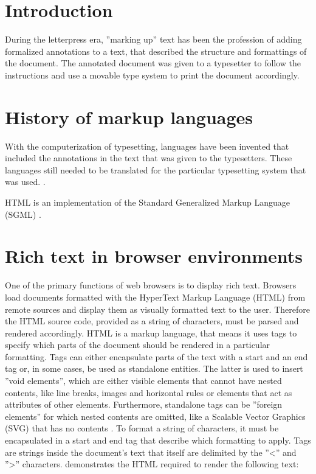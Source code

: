 \section{Introduction}

During the letterpress era, ''marking up'' text has been the profession of adding formalized annotations to a text, that described the structure and formattings of the document. The annotated document was given to a typesetter to follow the instructions and use a movable type system to print the document accordingly.

\section{History of markup languages}

With the computerization of typesetting, languages have been invented that included the annotations in the text that was given to the typesetters. These languages still needed to be translated for the particular typesetting system that was used.  \cite{watsonhistory}.




HTML is an implementation of the Standard Generalized Markup Language (SGML) \cite{ISO8879}.

\section{Rich text in browser environments}

One of the primary functions of web browsers is to display rich text. Browsers load documents formatted with the HyperText Markup Language (HTML) from remote sources and display them as visually formatted text to the user.
Therefore the HTML source code, provided as a string of characters, must be parsed and rendered accordingly. HTML is a markup language, that means it uses tags to specify which parts of the document should be rendered in a particular formatting. Tags can either encapsulate parts of the text with a start and an end tag or, in some cases, be used as standalone entities. 
The latter is used to insert ''void elements'', which are either visible elements that cannot have nested contents, like line breaks, images and horizontal rules or elements that act as attributes of other elements. Furthermore, standalone tags can be ''foreign elements'' for which nested contents are omitted, like a Scalable Vector Graphics (SVG) that has no contents \cite[Elements]{HTML5}. 
To format a string of characters, it must be encapsulated in a start and end tag that describe which formatting to apply. Tags are strings inside the document's text that itself are delimited by the ''<'' and ''>'' characters.  demonstrates the HTML required to render the following text:

